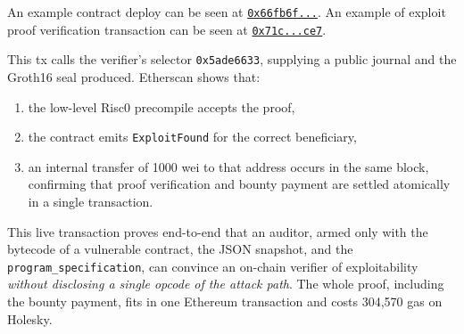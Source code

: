 An example contract deploy can be seen at
\href{https://holesky.etherscan.io/address/0x66fb6f74E1715eCFA340D6deE91613911aF79ae7}{\texttt{0x66fb6f...}}.
An example of exploit proof verification transaction can be seen at \href{https://holesky.etherscan.io/tx/0x71c18ec2040c8ddb0fe0be9e8f9d24d4fd867b4a8563bcdff40e1a38e7dd0ce7}{\texttt{0x71c...ce7}}. 

This tx calls the verifier’s selector \texttt{0x5ade6633}, supplying a public journal and the Groth16 seal produced. Etherscan shows that:
\begin{enumerate}
    \item the low-level Risc0 precompile accepts the proof,
    \item the contract emits \texttt{ExploitFound} for the correct beneficiary,
    \item an internal transfer of 1000 wei to that address occurs in
    the same block, confirming that proof verification and bounty payment are
    settled atomically in a single transaction.
\end{enumerate}

This live transaction proves end-to-end that an auditor, armed only with the
bytecode of a vulnerable contract, the JSON snapshot, and the \texttt{program\_specification}, can convince an on-chain verifier of exploitability \textit{without disclosing a single opcode of the attack path}.  
The whole proof, including the bounty payment, fits in one Ethereum
transaction and costs 304,570 {gas} on Holesky.

